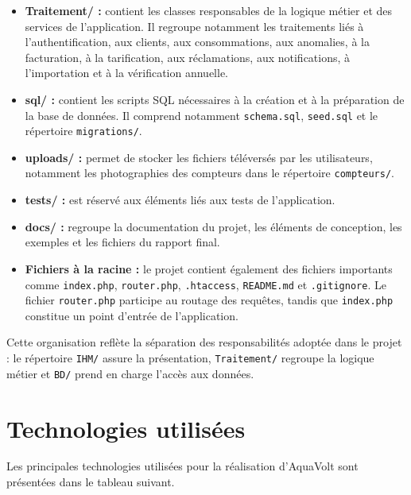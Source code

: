 \begin{itemize}[leftmargin=*]
    \item \textbf{Traitement/ :} contient les classes responsables de la logique métier et des services de l'application. Il regroupe notamment les traitements liés à l'authentification, aux clients, aux consommations, aux anomalies, à la facturation, à la tarification, aux réclamations, aux notifications, à l'importation et à la vérification annuelle.

    \item \textbf{sql/ :} contient les scripts SQL nécessaires à la création et à la préparation de la base de données. Il comprend notamment \texttt{schema.sql}, \texttt{seed.sql} et le répertoire \texttt{migrations/}.

    \item \textbf{uploads/ :} permet de stocker les fichiers téléversés par les utilisateurs, notamment les photographies des compteurs dans le répertoire \texttt{compteurs/}.

    \item \textbf{tests/ :} est réservé aux éléments liés aux tests de l'application.

    \item \textbf{docs/ :} regroupe la documentation du projet, les éléments de conception, les exemples et les fichiers du rapport final.

    \item \textbf{Fichiers à la racine :} le projet contient également des fichiers importants comme \texttt{index.php}, \texttt{router.php}, \texttt{.htaccess}, \texttt{README.md} et \texttt{.gitignore}. Le fichier \texttt{router.php} participe au routage des requêtes, tandis que \texttt{index.php} constitue un point d'entrée de l'application.

\end{itemize}

Cette organisation reflète la séparation des responsabilités adoptée dans le projet : le répertoire \texttt{IHM/} assure la présentation, \texttt{Traitement/} regroupe la logique métier et \texttt{BD/} prend en charge l'accès aux données.

\section{Technologies utilisées}

Les principales technologies utilisées pour la réalisation d'AquaVolt sont présentées dans le tableau suivant.

